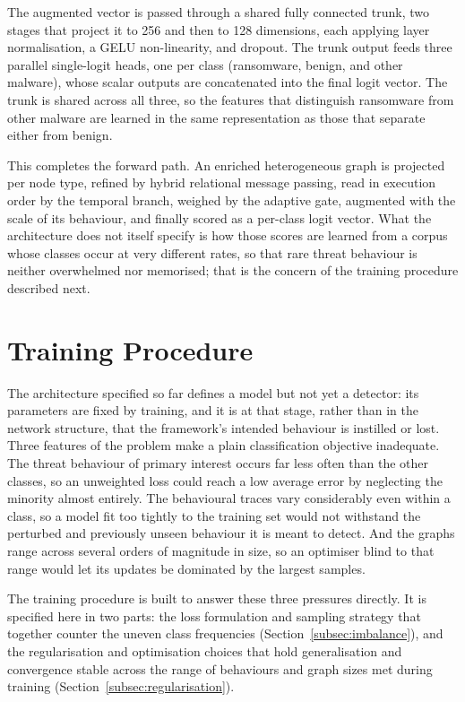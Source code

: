 \documentclass[%
    BCOR=10mm,
    DIV=13,
    toc=bibliography,
    toc=listof,
    oneside,
    12pt,
]{scrbook}
\begin{document}
The augmented vector is passed through a shared fully connected trunk, two
stages that project it to 256 and then to 128 dimensions, each applying layer
normalisation, a GELU non-linearity, and dropout. The trunk output feeds three
parallel single-logit heads, one per class (ransomware, benign, and other
malware), whose scalar outputs are concatenated into the final logit vector.
The trunk is shared across all three, so the features that distinguish
ransomware from other malware are learned in the same representation as those
that separate either from benign.

This completes the forward path. An enriched heterogeneous graph is projected
per node type, refined by hybrid relational message passing, read in execution
order by the temporal branch, weighed by the adaptive gate, augmented with the
scale of its behaviour, and finally scored as a per-class logit vector. What the
architecture does not itself specify is how those scores are learned from a
corpus whose classes occur at very different rates, so that rare threat
behaviour is neither overwhelmed nor memorised; that is the concern of the
training procedure described next.

\section{Training Procedure}
\label{sec:training}

The architecture specified so far defines a model but not yet a detector: its
parameters are fixed by training, and it is at that stage, rather than in the
network structure, that the framework's intended behaviour is instilled or lost.
Three features of the problem make a plain classification objective inadequate.
The threat behaviour of primary interest occurs far less often than the other
classes, so an unweighted loss could reach a low average error by neglecting the
minority almost entirely. The behavioural traces vary considerably even within a
class, so a model fit too tightly to the training set would not withstand the
perturbed and previously unseen behaviour it is meant to detect. And the graphs
range across several orders of magnitude in size, so an optimiser blind to that
range would let its updates be dominated by the largest samples.

The training procedure is built to answer these three pressures directly. It is
specified here in two parts: the loss formulation and sampling strategy that
together counter the uneven class frequencies
(Section~\ref{subsec:imbalance}), and the regularisation and optimisation
choices that hold generalisation and convergence stable across the range of
behaviours and graph sizes met during training
(Section~\ref{subsec:regularisation}).
\end{document}
